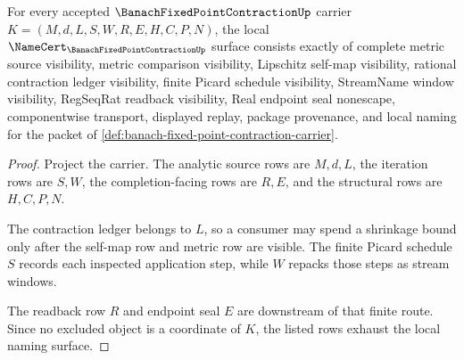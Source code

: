 \begin{theorem}
\label{thm:banach-fixed-point-contraction-obligation-surface}
For every accepted $\BanachFixedPointContractionUp$ carrier $K=(M,d,L,S,W,R,E,H,C,P,N)$, the local $\NameCert_{\BanachFixedPointContractionUp}$ surface consists exactly of complete metric source visibility, metric comparison visibility, Lipschitz self-map visibility, rational contraction ledger visibility, finite Picard schedule visibility, StreamName window visibility, RegSeqRat readback visibility, Real endpoint seal nonescape, componentwise transport, displayed replay, package provenance, and local naming for the packet of \autoref{def:banach-fixed-point-contraction-carrier}.
\end{theorem}
\begin{proof}
Project the carrier. The analytic source rows are $M,d,L$, the iteration rows are $S,W$, the completion-facing rows are $R,E$, and the structural rows are $H,C,P,N$.

The contraction ledger belongs to $L$, so a consumer may spend a shrinkage bound only after the self-map row and metric row are visible. The finite Picard schedule $S$ records each inspected application step, while $W$ repacks those steps as stream windows.

The readback row $R$ and endpoint seal $E$ are downstream of that finite route. Since no excluded object is a coordinate of $K$, the listed rows exhaust the local naming surface.
\end{proof}

